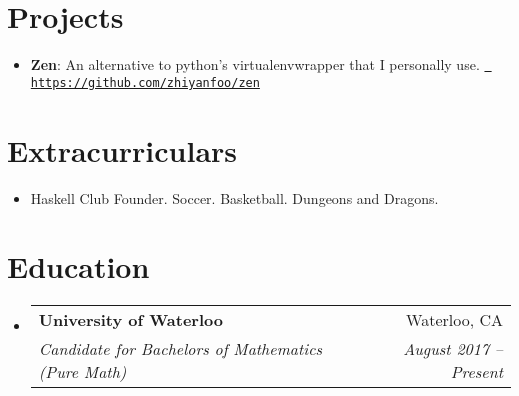\documentclass[letterpaper,11pt]{article}
\makeatletter
\newcommand{\resumeItem}[2]{
  \item\small{
    \textbf{#1}{: #2 \vspace{-2pt}}
  }
}
\newcommand{\resumeSubheading}[4]{
  \vspace{-1pt}\item
    \begin{tabular*}{0.97\textwidth}{l@{\extracolsep{\fill}}r}
      \textbf{#1} & #2 \\
      \textit{\small#3} & \textit{\small #4} \\
    \end{tabular*}\vspace{-5pt}
}
\newcommand{\resumeSubItem}[2]{\resumeItem{#1}{#2}\vspace{-4pt}}
\newcommand{\resumeSubHeadingListStart}{\begin{itemize}[leftmargin=*, label={}]}
\newcommand{\resumeSubHeadingListEnd}{\end{itemize}}
\makeatother
\begin{document}
\section{Projects}
  \resumeSubHeadingListStart
    \resumeSubItem{Zen}
      {An alternative to python's virtualenvwrapper that I personally use. 
            \href{https://github.com/zhiyanfoo/zen}{\tt
            https://github.com/zhiyanfoo/zen}
      }
  \resumeSubHeadingListEnd

\section{Extracurriculars}
 \resumeSubHeadingListStart
   \item{
       Haskell Club Founder. Soccer. Basketball. Dungeons and Dragons.
   }

 \resumeSubHeadingListEnd

\section{Education}
  \resumeSubHeadingListStart
    \resumeSubheading
      {University of Waterloo}{Waterloo, CA}
      {Candidate for Bachelors of Mathematics (Pure Math)}{August 2017 -- Present}
  \resumeSubHeadingListEnd
\end{document}
